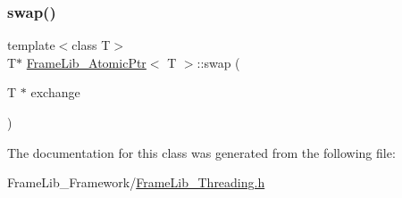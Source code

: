 \subsubsection{\texorpdfstring{swap()}{swap()}}
{\footnotesize\ttfamily template$<$class T$>$ \\
T$\ast$ \hyperlink{class_frame_lib___atomic_ptr}{Frame\+Lib\+\_\+\+Atomic\+Ptr}$<$ T $>$\+::swap (\begin{DoxyParamCaption}\item[{T $\ast$}]{exchange }\end{DoxyParamCaption})\hspace{0.3cm}{\ttfamily [inline]}}



The documentation for this class was generated from the following file\+:\begin{DoxyCompactItemize}
\item 
Frame\+Lib\+\_\+\+Framework/\hyperlink{_frame_lib___threading_8h}{Frame\+Lib\+\_\+\+Threading.\+h}\end{DoxyCompactItemize}
